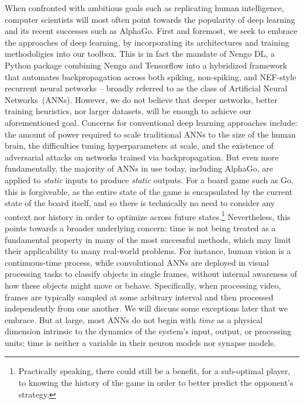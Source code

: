 When confronted with ambitious goals such as replicating human intelligence, computer scientists will most often point towards
the popularity of deep learning and its recent successes such as AlphaGo.
First and foremost, we seek to embrace the approaches of deep learning, by incorporating its architectures and training methodoligies into our toolbox.
This is in fact the mandate of Nengo DL, a Python package combining Nengo and Tensorflow into a hybridized framework that automates backpropagation across both spiking, non-spiking, and NEF-style recurrent neural networks -- broadly referred to as the class of Artificial Neural Networks~(ANNs).
However, we do not believe that deeper networks, better training heuristics, nor larger datasets, will be enough to achieve our aforementioned goal.
Concerns for conventional deep learning approaches include: the amount of power required to scale traditional ANNs to the size of the human brain, the difficulties tuning hyperparameters at scale, and the existence of adversarial attacks on networks trained via backpropagation.
But even more fundamentally, the majority of ANNs in use today, including AlphaGo, are applied to \emph{static} inputs to produce \emph{static} outputs.
For a board game such as Go, this is forgiveable, as the entire state of the game is encapsulated by the current state of the board itself, and so there is technically no need to consider any context nor history in order to optimize across future states.\footnote{
Practically speaking, there could still be a benefit, for a sub-optimal player, to knowing the history of the game in order to better predict the opponent's strategy.}
Nevertheless, this points towards a broader underlying concern: time is not being treated as a fundamental property in many of the most successful methods, which may limit their applicability to many real-world problems.
For instance, human vision is a continuous-time process, while convolutional ANNs are deployed in visual processing tasks to classify objects in single frames, without internal awareness of how these objects might move or behave.
Specifically, when processing video, frames are typically sampled at some arbitrary interval and then processed independently from one another.
We will discuss some exceptions later that we embrace.
But at large, most ANNs do not begin with {\it time} as a physical dimension intrinsic to the dynamics of the system's input, output, or processing units;
time is neither a variable in their neuron models nor synapse models.


